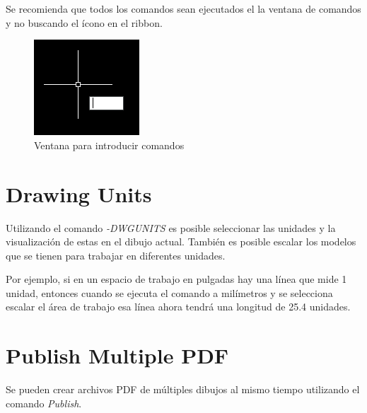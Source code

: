 \documentclass[12pt,letterpaper,final]{report}
\begin{document}
Se recomienda que todos los comandos sean ejecutados el la ventana de comandos y no buscando el ícono en el ribbon.

\begin{figure}[H]
	\centering
	\includegraphics[width=0.65\linewidth, height=0.5\textheight,keepaspectratio]{Imagenes/autocad_spacebar01}
	\caption{Ventana para introducir comandos}
	\label{fig:autocadspacebar01}
\end{figure}


\chapter{Drawing Units}

Utilizando el comando \emph{-DWGUNITS} es posible seleccionar las unidades y la visualización de estas en el dibujo actual. También es posible escalar los modelos que se tienen para trabajar en diferentes unidades.

Por ejemplo, si en un espacio de trabajo en pulgadas hay una línea que mide 1 unidad, entonces cuando se ejecuta el comando a milímetros y se selecciona escalar el área de trabajo esa línea ahora tendrá una longitud de 25.4 unidades.

\chapter{Publish Multiple PDF}

Se pueden crear archivos PDF de múltiples dibujos al mismo tiempo utilizando el comando \emph{Publish}.
\end{document}
